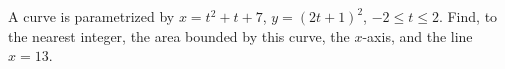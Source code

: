 A curve is parametrized by $x=t^2+t+7$, $y=(2t+1)^2$, $-2\le t\le2$. Find, to the nearest integer, the area bounded by this curve, the $x$-axis, and the line $x=13$.
